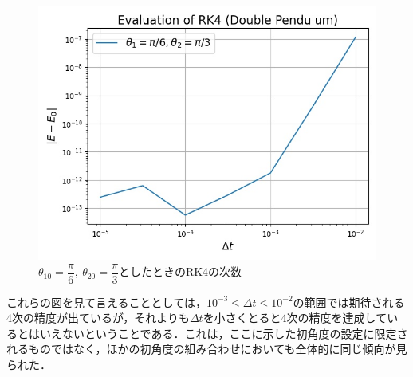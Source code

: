 \documentclass[a4paper,11pt]{jsarticle}
\begin{document}
\begin{figure}[H]
  \begin{center}
    \includegraphics{figure/RK42/evaluation1/pi6_pi3_2021-2-9-135446.jpeg}
    \caption{\(\theta_{10} = \dfrac{\pi}{6},\ \theta_{20}  = \dfrac{\pi}{3}\)としたときのRK4の次数}
    \label{fig:RK42-eval1-pi6-pi3}
  \end{center}
\end{figure}
これらの図を見て言えることとしては，\( 10^{-3} \leq \Delta t \leq 10^{-2}\)の範囲では期待される4次の精度が出ているが，それよりも\(\Delta t\)を小さくとると4次の精度を達成しているとはいえないということである．これは，ここに示した初角度の設定に限定されるものではなく，ほかの初角度の組み合わせにおいても全体的に同じ傾向が見られた．

\newpage
\end{document}
